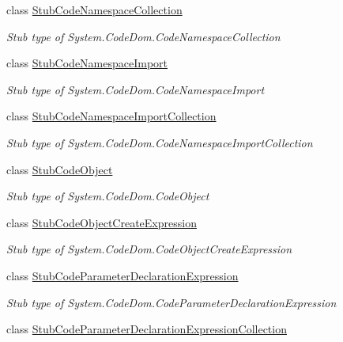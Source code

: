 \begin{DoxyCompactItemize}
class \hyperlink{class_system_1_1_code_dom_1_1_fakes_1_1_stub_code_namespace_collection}{Stub\-Code\-Namespace\-Collection}
\begin{DoxyCompactList}\small\item\em Stub type of System.\-Code\-Dom.\-Code\-Namespace\-Collection\end{DoxyCompactList}\item 
class \hyperlink{class_system_1_1_code_dom_1_1_fakes_1_1_stub_code_namespace_import}{Stub\-Code\-Namespace\-Import}
\begin{DoxyCompactList}\small\item\em Stub type of System.\-Code\-Dom.\-Code\-Namespace\-Import\end{DoxyCompactList}\item 
class \hyperlink{class_system_1_1_code_dom_1_1_fakes_1_1_stub_code_namespace_import_collection}{Stub\-Code\-Namespace\-Import\-Collection}
\begin{DoxyCompactList}\small\item\em Stub type of System.\-Code\-Dom.\-Code\-Namespace\-Import\-Collection\end{DoxyCompactList}\item 
class \hyperlink{class_system_1_1_code_dom_1_1_fakes_1_1_stub_code_object}{Stub\-Code\-Object}
\begin{DoxyCompactList}\small\item\em Stub type of System.\-Code\-Dom.\-Code\-Object\end{DoxyCompactList}\item 
class \hyperlink{class_system_1_1_code_dom_1_1_fakes_1_1_stub_code_object_create_expression}{Stub\-Code\-Object\-Create\-Expression}
\begin{DoxyCompactList}\small\item\em Stub type of System.\-Code\-Dom.\-Code\-Object\-Create\-Expression\end{DoxyCompactList}\item 
class \hyperlink{class_system_1_1_code_dom_1_1_fakes_1_1_stub_code_parameter_declaration_expression}{Stub\-Code\-Parameter\-Declaration\-Expression}
\begin{DoxyCompactList}\small\item\em Stub type of System.\-Code\-Dom.\-Code\-Parameter\-Declaration\-Expression\end{DoxyCompactList}\item 
class \hyperlink{class_system_1_1_code_dom_1_1_fakes_1_1_stub_code_parameter_declaration_expression_collection}{Stub\-Code\-Parameter\-Declaration\-Expression\-Collection}

\end{DoxyCompactItemize}

